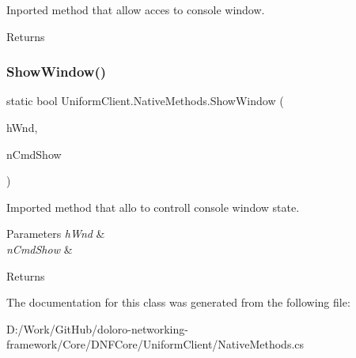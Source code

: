 Inported method that allow acces to console window. 

\begin{DoxyReturn}{Returns}

\end{DoxyReturn}
\mbox{\label{class_uniform_client_1_1_native_methods_a067dec2d455070ab352fef3caef7b323}} 
\subsubsection{\texorpdfstring{Show\+Window()}{ShowWindow()}}
{\footnotesize\ttfamily static bool Uniform\+Client.\+Native\+Methods.\+Show\+Window (\begin{DoxyParamCaption}\item[{Int\+Ptr}]{h\+Wnd,  }\item[{int}]{n\+Cmd\+Show }\end{DoxyParamCaption})}



Imported method that allo to controll console window state. 


\begin{DoxyParams}{Parameters}
{\em h\+Wnd} & \\
\hline
{\em n\+Cmd\+Show} & \\
\hline
\end{DoxyParams}
\begin{DoxyReturn}{Returns}

\end{DoxyReturn}


The documentation for this class was generated from the following file\+:\begin{DoxyCompactItemize}
\item 
D\+:/\+Work/\+Git\+Hub/doloro-\/networking-\/framework/\+Core/\+D\+N\+F\+Core/\+Uniform\+Client/Native\+Methods.\+cs\end{DoxyCompactItemize}

